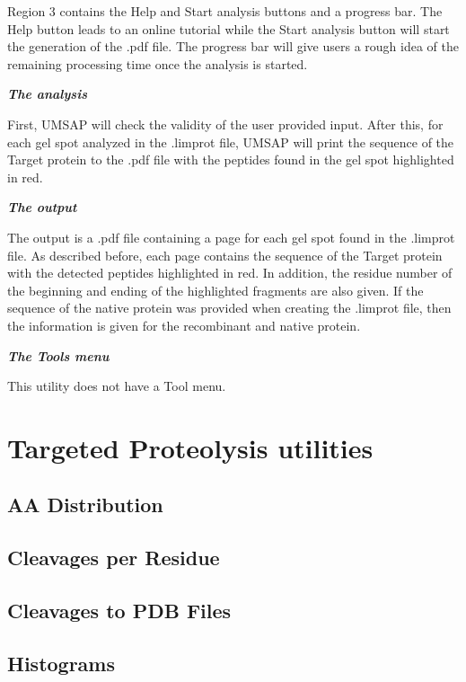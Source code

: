 Region \num{3} contains the Help and Start analysis buttons and a progress bar. The Help button leads to an online tutorial while the Start analysis button will start the generation of the .pdf file. The progress bar will give users a rough idea of the remaining processing time once the analysis is started.

\textit{\textbf{The analysis}}

First, UMSAP will check the validity of the user provided input. After this, for each gel spot analyzed in the .limprot file, UMSAP will print the sequence of the Target protein to the .pdf file with the peptides found in the gel spot highlighted in red.

\textit{\textbf{The output}} 

The output is a .pdf file containing a page for each gel spot found in the .limprot file. As described before, each page contains the sequence of the Target protein with the detected peptides highlighted in red. In addition, the residue number of the beginning and ending of the highlighted fragments are also given. If the sequence of the native protein was provided when creating the .limprot file, then the information is given for the recombinant and native protein. 

\textit{\textbf{The Tools menu}}

This utility does not have a Tool menu.

\section{Targeted Proteolysis utilities }  

\subsection{AA Distribution}

\subsection{Cleavages per Residue}


\subsection{Cleavages to PDB Files}

\subsection{Histograms}

